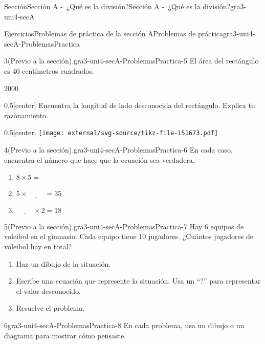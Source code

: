 \documentclass[twoside,10pt,]{article}
\begin{document}
\begin{sectionptx}{Sección}{Sección A -~¿Qué es la división?}{}{Sección A -~¿Qué es la división?}{}{}{gra3-uni4-secA}
\begin{exercises-subsection}{Ejercicios}{Problemas de práctica de la sección A}{}{Problemas de práctica}{}{}{gra3-uni4-secA-ProblemasPractica}
\begin{divisionexercise}{3}{(Previo a la sección).}{}{gra3-uni4-secA-ProblemasPractica-5}
El área del rectángulo es 40 centímetros cuadrados.%
\begin{sidebyside}{2}{0}{0}{0}%
\begin{sbspanel}{0.5}[center]%
Encuentra la longitud de lado desconocida del rectángulo. Explica tu razonamiento.%
\end{sbspanel}%
\begin{sbspanel}{0.5}[center]%
\texttt{[image: external/svg-source/tikz-file-151673.pdf]}
\end{sbspanel}%
\end{sidebyside}%
\end{divisionexercise}%
\begin{divisionexercise}{4}{(Previo a la sección).}{}{gra3-uni4-secA-ProblemasPractica-6}%
En cada caso, encuentra el número que hace que la ecuación sea verdadera.%
\par
%
\begin{enumerate}[label=(\alph*)]
\item{}\(\displaystyle 8 \times 5 = \underline{\hspace{1cm}}\)%
\item{}\(\displaystyle 5 \times \underline{\hspace{1cm}} = 35\)%
\item{}\(\displaystyle \underline{\hspace{1cm}} \times 2 = 18\)%
\end{enumerate}
%
\end{divisionexercise}%
\begin{divisionexercise}{5}{(Previo a la sección).}{}{gra3-uni4-secA-ProblemasPractica-7}%
Hay 6 equipos de voleibol en el gimnasio. Cada equipo tiene 10 jugadores. ¿Cuántos jugadores de voleibol hay en total?%
\par
%
\begin{enumerate}[label=(\alph*)]
\item{}Haz un dibujo de la situación.%
\item{}Escribe una ecuación que represente la situación. Usa un “?” para representar el valor desconocido.%
\item{}Resuelve el problema.%
\end{enumerate}
%
\end{divisionexercise}%
\begin{divisionexercise}{6}{}{}{gra3-uni4-secA-ProblemasPractica-8}%
En cada problema, usa un dibujo o un diagrama para mostrar cómo pensaste.%
\par
%
\begin{enumerate}[label=(\alph*)]

\end{enumerate}
\end{divisionexercise}
\end{exercises-subsection}
\end{sectionptx}
\end{document}

